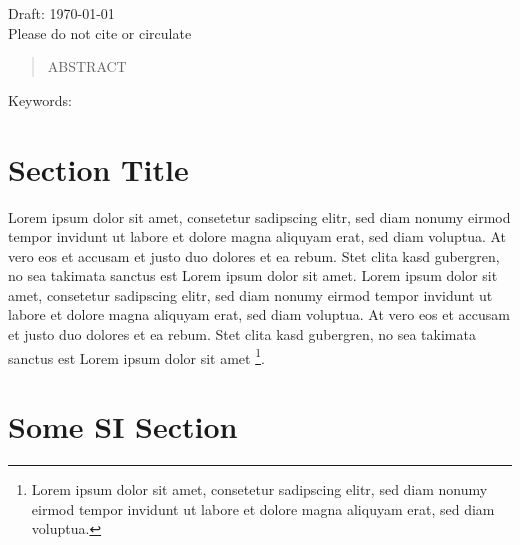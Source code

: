 \documentclass{iheid}
\author{
\myauthor$^{1,\ast}$, Second Author$^{1}$ %
}
\date{} %
\begin{document}
\begin{titlepage}
\maketitle %

\begin{center}
Draft: \today\\
Please do not cite or circulate
\end{center}

\begin{abstract}
ABSTRACT
\end{abstract}

\begin{center}
{Keywords: \it \mykeywords}
\end{center}

\thispagestyle{firstpages} %
\end{titlepage} 

\restoregeometry %
\setcounter{page}{1} %
\clearpage %

\section{Section Title}\label{sec:intro}
Lorem ipsum dolor sit amet, consetetur sadipscing elitr, sed diam nonumy eirmod tempor invidunt ut labore et dolore magna aliquyam erat, sed diam voluptua. At vero eos et accusam et justo duo dolores et ea rebum. Stet clita kasd gubergren, no sea takimata sanctus est Lorem ipsum dolor sit amet. Lorem ipsum dolor sit amet, consetetur sadipscing elitr, sed diam nonumy eirmod tempor invidunt ut labore et dolore magna aliquyam erat, sed diam voluptua. At vero eos et accusam et justo duo dolores et ea rebum. Stet clita kasd gubergren, no sea takimata sanctus est Lorem ipsum dolor sit amet
\footnote{
Lorem ipsum dolor sit amet, consetetur sadipscing elitr, sed diam nonumy eirmod tempor invidunt ut labore et dolore magna aliquyam erat, sed diam voluptua.
}.

\printbibliography 

\appendix

\section{Some SI Section}\label{app:LABEL}

\end{document}
